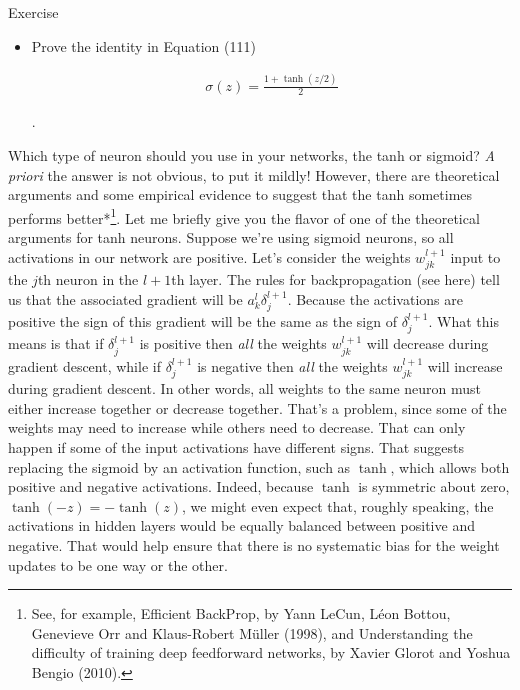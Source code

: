 \begin{exerciseBox}{Exercise}


\begin{itemize}

\item 
Prove the identity in Equation (111)


\begin{align*}
\sigma(z) = \frac{1+\tanh(z/2)}{2} \nonumber
\end{align*}

.

\end{itemize}


Which type of neuron should you use in your networks, the tanh or sigmoid? \emph{A priori} the answer is not obvious, to put it mildly! However, there are theoretical arguments and some empirical evidence to suggest that the tanh sometimes performs better*\footnote{See, for example, Efficient BackProp, by Yann LeCun, Léon Bottou, Genevieve Orr and Klaus-Robert Müller (1998), and Understanding the difficulty of training deep feedforward networks, by Xavier Glorot and Yoshua Bengio (2010).}. Let me briefly give you the flavor of one of the theoretical arguments for tanh neurons. Suppose we're using sigmoid neurons, so all activations in our network are positive. Let's consider the weights $w^{l+1}_{jk}$ input to the $j$th neuron in the $l+1$th layer. The rules for backpropagation (see here) tell us that the associated gradient will be $a^l_k \delta^{l+1}_j$. Because the activations are positive the sign of this gradient will be the same as the sign of $\delta^{l+1}_j$. What this means is that if $\delta^{l+1}_j$ is positive then \emph{all} the weights $w^{l+1}_{jk}$ will decrease during gradient descent, while if $\delta^{l+1}_j$ is negative then \emph{all} the weights $w^{l+1}_{jk}$ will increase during gradient descent. In other words, all weights to the same neuron must either increase together or decrease together. That's a problem, since some of the weights may need to increase while others need to decrease. That can only happen if some of the input activations have different signs. That suggests replacing the sigmoid by an activation function, such as $\tanh$, which allows both positive and negative activations. Indeed, because $\tanh$ is symmetric about zero, $\tanh(-z) = -\tanh(z)$, we might even expect that, roughly speaking, the activations in hidden layers would be equally balanced between positive and negative. That would help ensure that there is no systematic bias for the weight updates to be one way or the other.



\end{exerciseBox}
